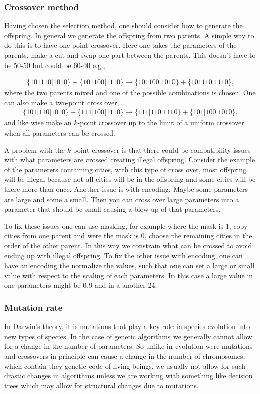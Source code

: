 \documentclass[12pt,a4paper]{article} %
\numberwithin{equation}{section}
\begin{document}
		\subsubsection{Crossover method}
			Having chosen the selection method, one should consider how to generate the offspring. In general we generate the offspring from two parents. A simple way to do this is to have one-point crossover. Here one takes the parameters of the parents, make a cut and swap one part between the parents. This doesn't have to be 50-50 but could be 60-40 e.g.,
			
			\begin{gather}
				\{ 101110|1010 \} + \{ 101100|1110 \}  \rightarrow  \{ 101100|1010 \} +  \{ 101110|1110 \},
			\end{gather}
			where the two parents mixed and one of the possible combinations is chosen. One can also make a two-point cross over,
			\begin{gather}
				\{ 101|110|1010 \} + \{ 111|100|1110 \}  \rightarrow  \{ 111|110|1110 \} +  \{ 101|100|1010 \},
			\end{gather}
			and like wise make an $k$-point crossover up to the limit of a uniform crossover when all parameters can be crossed.
			
			A problem with the $k$-point crossover is that there could be compatibility issues with what parameters are crossed creating illegal offspring. Consider the example of the parameters containing cities, with this type of cross over, most offspring will be illegal because not all cities will be in the offspring and some cities will be there more than once. Another issue is with encoding. Maybe some parameters are large and some a small. Then you can cross over large parameters into a parameter that should be small causing a blow up of that parameters.
			
			To fix these issues one can use masking, for example where the mask is 1, copy cities from one parent 
			and were the mask is 0, choose the remaining cities in the order of the other parent. In this way we constrain what can be crossed to avoid ending up with illegal offspring. To fix the other issue with encoding, one can have an encoding the normalize the values, such that one can set a large or small value with respect to the scaling of each parameters. In this case a large value in one parameters might be 0.9 and in a another 24. 
			
		\subsubsection{Mutation rate}
			In Darwin's theory, it is mutations that play a key role in species evolution into new types of species. In the case of genetic algorithms we generally cannot allow for a change in the number of parameters. So unlike in evolution were mutations and crossovers in principle can cause a change in the number of chromosomes, which contain they genetic code of living beings, we usually not allow for such drastic changes in algorithms unless we are working with something like decision trees which may allow for structural changes due to mutations.
			
\end{document}
